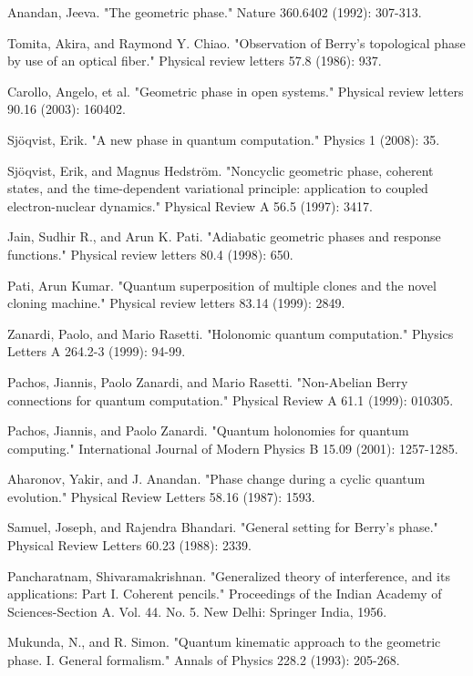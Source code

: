 \begin{thebibliography}{9}
Anandan, Jeeva. "The geometric phase." Nature 360.6402 (1992): 307-313.

Tomita, Akira, and Raymond Y. Chiao. "Observation of Berry's topological phase by use of an optical fiber." Physical review letters 57.8 (1986): 937.

Carollo, Angelo, et al. "Geometric phase in open systems." Physical review letters 90.16 (2003): 160402.

Sjöqvist, Erik. "A new phase in quantum computation." Physics 1 (2008): 35.

Sjöqvist, Erik, and Magnus Hedström. "Noncyclic geometric phase, coherent states, and the time-dependent variational principle: application to coupled electron-nuclear dynamics." Physical Review A 56.5 (1997): 3417.

Jain, Sudhir R., and Arun K. Pati. "Adiabatic geometric phases and response functions." Physical review letters 80.4 (1998): 650.

Pati, Arun Kumar. "Quantum superposition of multiple clones and the novel cloning machine." Physical review letters 83.14 (1999): 2849.

Zanardi, Paolo, and Mario Rasetti. "Holonomic quantum computation." Physics Letters A 264.2-3 (1999): 94-99.

Pachos, Jiannis, Paolo Zanardi, and Mario Rasetti. "Non-Abelian Berry connections for quantum computation." Physical Review A 61.1 (1999): 010305.

Pachos, Jiannis, and Paolo Zanardi. "Quantum holonomies for quantum computing." International Journal of Modern Physics B 15.09 (2001): 1257-1285.

Aharonov, Yakir, and J. Anandan. "Phase change during a cyclic quantum evolution." Physical Review Letters 58.16 (1987): 1593.

Samuel, Joseph, and Rajendra Bhandari. "General setting for Berry's phase." Physical Review Letters 60.23 (1988): 2339.


Pancharatnam, Shivaramakrishnan. "Generalized theory of interference, and its applications: Part I. Coherent pencils." Proceedings of the Indian Academy of Sciences-Section A. Vol. 44. No. 5. New Delhi: Springer India, 1956.

Mukunda, N., and R. Simon. "Quantum kinematic approach to the geometric phase. I. General formalism." Annals of Physics 228.2 (1993): 205-268.


\end{thebibliography}
